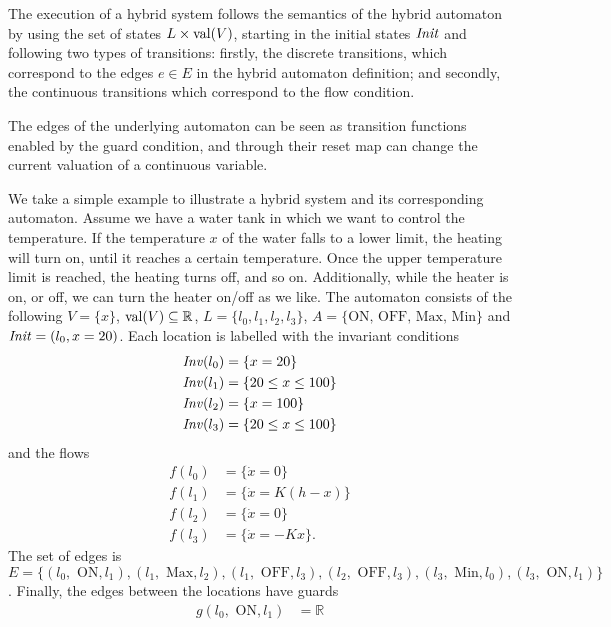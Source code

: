 The execution of a hybrid system follows the semantics of the hybrid automaton by using the set of states $L\times\operatorname{val}(V)$, starting in the initial states $\mathit{Init}$ and following two types of transitions: firstly, the discrete transitions, which correspond to the edges $e\in E$ in the hybrid automaton definition; and secondly, the continuous transitions which correspond to the flow condition.

The edges of the underlying automaton can be seen as transition functions enabled by the guard condition, and through their reset map can change the current valuation of a continuous variable.\cite{Halbwachs1994}

\begin{ex}
We take a simple example to illustrate a hybrid system and its corresponding automaton. Assume we have a water tank in which we want to control the temperature. If the temperature $x$ of the water falls to a lower limit, the heating will turn on, until it reaches a certain temperature. Once the upper temperature limit is reached, the heating turns off, and so on. Additionally, while the heater is on, or off, we can turn the heater on/off as we like. The automaton consists of the following $V=\{x\}$, $\operatorname{val}(V)\subseteq\mathbb{R}$, $L=\{l_{0},l_{1},l_{2},l_{3}\}$, $A=\{\text{ON, OFF, Max, Min}\}$ and $\mathit{Init}=(l_{0},x=20)$. Each location is labelled with the invariant conditions
\begin{align*}
    \mathit{Inv}(l_{0}) & = \{x=20\} \\
    \mathit{Inv}(l_{1}) & = \{20\leq x\leq100\} \\
    \mathit{Inv}(l_{2}) & = \{x=100\} \\
    \mathit{Inv}(l_{3}) & = \{20\leq x\leq100\}
\end{align*}
and the flows
\begin{align*}
    f(l_{0}) & = \{\dot{x} = 0\} \\
    f(l_{1}) & = \{\dot{x} = K(h-x)\} \\
    f(l_{2}) & = \{\dot{x} = 0\} \\
    f(l_{3}) & = \{\dot{x} = -Kx\}.
\end{align*}
The set of edges is $E=\{(l_{0},\text{ ON},l_{1}), (l_{1},\text{ Max},l_{2}), (l_{1},\text{ OFF},l_{3}), (l_{2},\text{ OFF},l_{3}), (l_{3},\text{ Min},l_{0}), (l_{3},\text{ ON},l_{1})\}$.
Finally, the edges between the locations have guards
\begin{align*}
    g(l_{0},\text{ ON},l_{1}) &= \mathbb{R}\\

\end{align*}
\end{ex}
